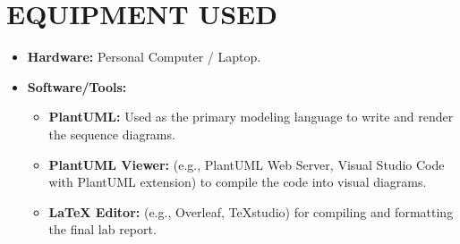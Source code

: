 \chapter{EQUIPMENT USED}
\label{ch:eqp_used}
\begin{itemize}
    \item \textbf{Hardware:} Personal Computer / Laptop.
    \item \textbf{Software/Tools:} 
    \begin{itemize}
        \item \textbf{PlantUML:} Used as the primary modeling language to write and render the sequence diagrams.
        \item \textbf{PlantUML Viewer:} (e.g., PlantUML Web Server, Visual Studio Code with PlantUML extension) to compile the code into visual diagrams.
        \item \textbf{LaTeX Editor:} (e.g., Overleaf, TeXstudio) for compiling and formatting the final lab report.
    \end{itemize}
\end{itemize}







